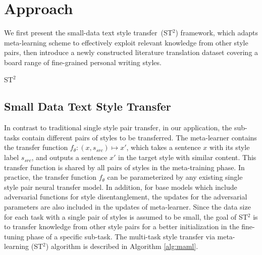 \section{Approach}
\label{sec:approach}
We first present the small-data text style transfer~(ST$^2$) framework, which adapts meta-learning scheme to effectively exploit relevant knowledge from other style pairs, then introduce a newly constructed literature translation dataset covering a board range of fine-grained personal writing styles.
\begin{algorithm}\small
	\caption{ST$^2$}
	\label{alg:maml}
\end{algorithm}
\label{sec:st2}

\subsection{Small Data Text Style Transfer}
In contrast to traditional single style pair transfer, in our application, 
the sub-tasks contain different pairs of styles to be transferred. 
The meta-learner contains the transfer function 
$f_{\theta}: (x, s_{src})\mapsto x'$, which takes a sentence $x$ with its 
style label $s_{src}$, and outputs a sentence $x'$ in the target style with 
similar content. This transfer function is shared by all pairs of styles 
in the meta-training phase. In practice, the transfer function $f_\theta$ can be parameterized by any existing single style pair neural transfer model. In addition, for base models which include adversarial functions for style disentanglement, the updates for the adversarial parameters are also included in the updates of meta-learner. Since the data size for each task with a 
single pair of styles is assumed to be small, 
the goal of ST$^2$ is to transfer knowledge from other style pairs for a better initialization in the fine-tuning phase of a specific sub-task. 
The multi-task style transfer via meta-learning (ST$^2$) algorithm is 
described in Algorithm \ref{alg:maml}. 

